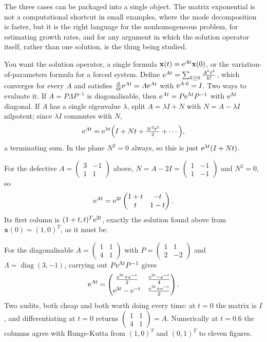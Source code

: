 The three cases can be packaged into a single object. The matrix exponential is not a computational shortcut in small examples, where the mode decomposition is faster, but it is the right language for the nonhomogeneous problem, for estimating growth rates, and for any argument in which the solution operator itself, rather than one solution, is the thing being studied.

\cue You want the solution operator, a single formula $\mathbf{x}(t)=\mathrm{e}^{At}\mathbf{x}(0)$, or the variation-of-parameters formula for a forced system.
\method Define $\mathrm{e}^{At}=\sum_{k\ge0}\frac{A^{k}t^{k}}{k!}$, which converges for every $A$ and satisfies $\frac{\mathrm{d}}{\mathrm{d}t}\mathrm{e}^{At}=A\mathrm{e}^{At}$ with $\mathrm{e}^{A\cdot0}=I$. Two ways to evaluate it. If $A=P\Lambda P^{-1}$ is diagonalisable, then $\mathrm{e}^{At}=P\mathrm{e}^{\Lambda t}P^{-1}$ with $\mathrm{e}^{\Lambda t}$ diagonal. If $A$ has a single eigenvalue $\lambda$, split $A=\lambda I+N$ with $N=A-\lambda I$ nilpotent; since $\lambda I$ commutes with $N$,
\[\mathrm{e}^{At}=\mathrm{e}^{\lambda t}\Bigl(I+Nt+\tfrac{N^{2}t^{2}}{2}+\cdots\Bigr),\]
a terminating sum. In the plane $N^{2}=0$ always, so this is just $\mathrm{e}^{\lambda t}(I+Nt)$.

\begin{worked}
For the defective $A=\begin{pmatrix}3&-1\\1&1\end{pmatrix}$ above, $N=A-2I=\begin{pmatrix}1&-1\\1&-1\end{pmatrix}$ and $N^{2}=0$, so
\[\mathrm{e}^{At}=\mathrm{e}^{2t}\begin{pmatrix}1+t&-t\\t&1-t\end{pmatrix}.\]
Its first column is $(1+t,t)^{T}\mathrm{e}^{2t}$, exactly the solution found above from $\mathbf{x}(0)=(1,0)^{T}$, as it must be.

For the diagonalisable $A=\begin{pmatrix}1&1\\4&1\end{pmatrix}$ with $P=\begin{pmatrix}1&1\\2&-2\end{pmatrix}$ and $\Lambda=\operatorname{diag}(3,-1)$, carrying out $P\mathrm{e}^{\Lambda t}P^{-1}$ gives
\[\mathrm{e}^{At}=\begin{pmatrix}\tfrac{\mathrm{e}^{3t}+\mathrm{e}^{-t}}{2}&\tfrac{\mathrm{e}^{3t}-\mathrm{e}^{-t}}{4}\\[2pt]\mathrm{e}^{3t}-\mathrm{e}^{-t}&\tfrac{\mathrm{e}^{3t}+\mathrm{e}^{-t}}{2}\end{pmatrix}.\]
Two audits, both cheap and both worth doing every time: at $t=0$ the matrix is $I$, and differentiating at $t=0$ returns $\begin{pmatrix}1&1\\4&1\end{pmatrix}=A$. Numerically at $t=0.6$ the columns agree with Runge-Kutta from $(1,0)^{T}$ and $(0,1)^{T}$ to eleven figures.
\end{worked}

